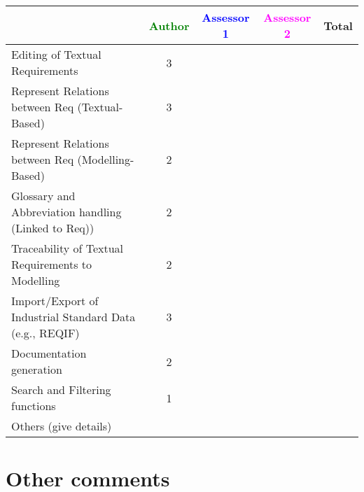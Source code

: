 \begin{tabular}{|l | c | c | c | c|}
\hline
& \textcolor{green}{Author} & \textcolor{blue}{Assessor 1} & \textcolor{magenta}{Assessor 2} & Total \\
\hline 
Editing of Textual Requirements & 3 & & &  \\
\hline
Represent Relations between Req (Textual-Based) & 3 & & & \\
\hline
Represent Relations between Req (Modelling-Based) & 2 & & & \\
\hline
Glossary and Abbreviation handling (Linked to Req)) & 2 & & & \\
\hline
Traceability of Textual Requirements to Modelling & 2 & & & \\
\hline
Import/Export of Industrial Standard Data (e.g., REQIF) & 3 & & & \\
\hline
Documentation generation & 2 & & &  \\
\hline
Search and Filtering functions & 1 & & & \\
\hline
Others (give details) & & & & \\
\hline
\end{tabular}


\section{Other comments}



\begin{comment}
This section is available for the author or the assessors to  complete the description and criteria.
\end{comment}



